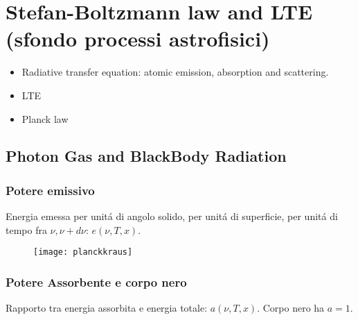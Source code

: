 \part{Stefan-Boltzmann law and LTE (sfondo processi astrofisici)}
    \begin{itemize}
    \item Radiative transfer equation: atomic emission, absorption and scattering.
    \item LTE
    \item Planck law
    \end{itemize}
    \chapter{Photon Gas and BlackBody Radiation}
        \section{Potere emissivo}
                Energia emessa per unit\'a di angolo solido, per unit\'a di superficie, per unit\'a di tempo fra $\nu,\nu+d\nu$: $e(\nu,T,x)$.
                \begin{figure}
                \texttt{[image: planckkraus]}
                \label{planckkraus}
                \end{figure}
        \section{Potere Assorbente e corpo nero}
                Rapporto tra energia assorbita e energia totale: $a(\nu,T,x)$. Corpo nero ha $a=1$.
